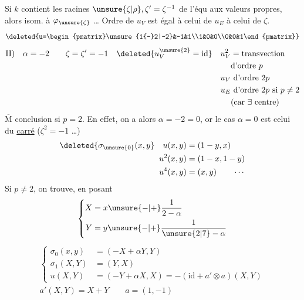 Si $k$ contient les racines $\unsure{\zeta|\rho},\zeta'=\zeta^{-1}$ de l'équ aux valeurs propres, alors  isom. à \deleted{$\Pi_\zeta$} $\varphi_{\unsure{\zeta}}$ \dots{} Ordre de $u_V$ est égal à celui de $u_E$  à celui de $\zeta$.
  
\[
\deleted{u=\begin{pmatrix}\unsure{1{-}2|-2}&-1&1\\1&0&0\\0&0&1\end{pmatrix}}
\]
\[
\begin{aligned}
\text{II)}\quad\alpha&=-2\qquad \zeta=\zeta'=-1&
\deleted{u_V^{\unsure{2}}=\mathrm{id}}\quad u_V^2&=\text{transvection}\\
&&&\text{d'ordre }p\\
&&u_V&\ \text{d'ordre }2p\\
&&u_E&\ \text{d'ordre }2p\text{ si }p\ne2\\
&&&(\text{car }\exists\text{ centre})
\end{aligned}
\]
$\overline{\mathrm M}$ conclusion si $p=2$. En effet, on a alors $\alpha=-2=0$, or le cas $\alpha=0$ est celui du \uline{carré} ($\zeta^2=-1$ \dots)
\[
\begin{aligned}
\deleted{\sigma_{\unsure{0}}(x,y}\quad u(x,y)&=(1-y,x)\\
u^2(x,y)&=(1-x,1-y)\\
u^4(x,y)&=(x,y)\qquad\cdots
\end{aligned}
\]
Si $p\ne2$,  on trouve, en posant
\[
\left\{\begin{aligned}X&=x\unsure{-|+}\frac{1}{2-\alpha}\\Y&=y\unsure{-|+}\frac{1}{\unsure{2|7}-\alpha}\end{aligned}\right.
\]
\[
\begin{aligned}
\left\{\begin{aligned}\sigma_0(x,y)&=(-X+\alpha Y,Y)\\\sigma_1(X,Y)&=(Y,X)\\u(X,Y)&=(-Y+\alpha X,X)=-(\mathrm{id}+a'\otimes a)(X,Y)\end{aligned}\right.\\
a'(X,Y)=X+Y\qquad a=(1,-1)
\end{aligned}
\]
